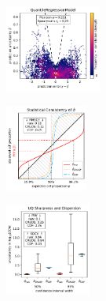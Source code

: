 \begin{figure}[H]
    \begin{subfigure}
    \centering
    \includegraphics[width=0.345\textwidth,valign=t]{uncertainty/figures/uq.quantileregressionmodel-correlation.pdf}
    \end{subfigure}
    \begin{subfigure}
    \centering
    \includegraphics[width=0.297\textwidth,valign=t]{uncertainty/figures/uq.quantileregressionmodel-consistency.pdf}
    \end{subfigure}
    \begin{subfigure}
    \centering
    \includegraphics[width=0.308\textwidth,valign=t]{uncertainty/figures/uq.quantileregressionmodel-sharpness.pdf}
    \end{subfigure}


\end{figure}
